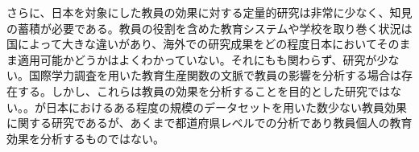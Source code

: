 \documentclass[a4paper,12pt]{article}
\begin{document}
さらに、日本を対象にした教員の効果に対する定量的研究は非常に少なく、知見の蓄積が必要である。教員の役割を含めた教育システムや学校を取り巻く状況は国によって大きな違いがあり、海外での研究成果をどの程度日本においてそのまま適用可能かどうかはよくわかっていない。それにもも関わらず、研究が少ない。国際学力調査を用いた教育生産関数の文脈で教員の影響を分析する場合は存在する\citep{hojo2012factors, hojo2012determinants}。しかし、これらは教員の効果を分析することを目的とした研究ではない。。\cite{二木美苗2017子ども}が日本におけるある程度の規模のデータセットを用いた数少ない教員効果に関する研究であるが、あくまで都道府県レベルでの分析であり教員個人の教育効果を分析するものではない。
\end{document}
